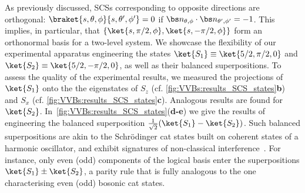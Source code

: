 As previously discussed, SCSs corresponding to opposite directions are orthogonal: $\braket{s,\theta,\phi}{s,\theta',\phi'}=0$ if $\bs n_{\theta,\phi}\cdot\bs n_{\theta',\phi'}=-1$.
This implies, in particular, that
$\{\ket{s,\pi/2,\phi},\ket{s,-\pi/2,\phi}\}$
form an orthonormal basis for a two-level system.
We showcase the flexibility of our experimental apparatus engineering the states $\ket{S_1}\equiv\ket{5/2,\pi/2,0}$ and $\ket{S_2}\equiv\ket{5/2,-\pi/2,0}$, as well as their balanced superpositions.
To assess the quality of the experimental results, we measured the projections of $\ket{S_1}$ onto the the eigenstates of $S_z$ (cf. \cref{fig:VVBs:results_SCS_states}\textbf{b}) and $S_x$ (cf. \cref{fig:VVBs:results_SCS_states}\textbf{c}). Analogous results are found for $\ket{S_2}$.
In~\cref{fig:VVBs:results_SCS_states}(\textbf{d-e}) we give the results of engineering the balanced superposition $\frac{1}{\sqrt{2}}(\ket{S_1}-\ket{S_2})$.
Such balanced superpositions are akin to the Schrödinger cat states built on coherent states of a harmonic oscillator, and exhibit signatures of non-classical interference~\cite{agarwal1997atomic}. For instance, only even (odd) components of the logical basis enter the superpositions $\ket{S_1}\pm\ket{S_2}$, a parity rule that is fully analogous to the one characterising even (odd) bosonic cat states.

